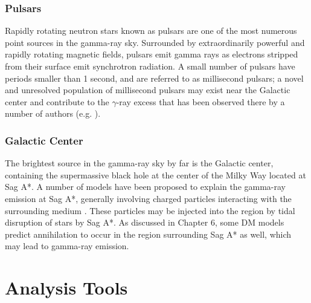 \subsubsection{Pulsars}
Rapidly rotating neutron stars known as pulsars are one of the most numerous point sources in the gamma-ray sky. Surrounded by extraordinarily powerful and rapidly rotating magnetic fields, pulsars emit gamma rays as electrons stripped from their surface emit synchrotron radiation. A small number of pulsars have periods smaller than 1 second, and are referred to as millisecond pulsars; a novel and unresolved population of millisecond pulsars may exist near the Galactic center and contribute to the $\gamma$-ray excess that has been observed there by a number of authors (e.g. \cite{bhakta_searching_2017}).
\subsubsection{Galactic Center}
	The brightest source in the gamma-ray sky by far is the Galactic center, containing the supermassive black hole at the center of the Milky Way located at Sag A*. A number of models have been proposed to explain the gamma-ray emission at Sag A*, generally involving charged particles interacting with the surrounding medium \cite{van_eldik_gamma_2015}. These particles may be injected into the region by tidal disruption of stars by Sag A*. As discussed in Chapter 6, some DM models predict annihilation to occur in the region surrounding Sag A* as well, which may lead to gamma-ray emission.

\section{Analysis Tools}

